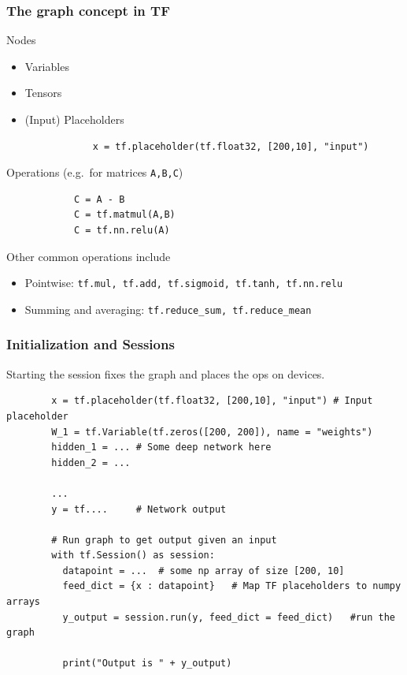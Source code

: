 \documentclass[mathserif]{beamer}
\begin{document}
\begin{frame}[fragile]
	\frametitle{The graph concept in TF}
		
	
	\begin{block}{Nodes}
	\begin{itemize}		
		\item Variables
		\item Tensors
		\item (Input) Placeholders
		\begin{verbatim}
			x = tf.placeholder(tf.float32, [200,10], "input")
		\end{verbatim}
	\end{itemize}
	\end{block}
	\begin{block}{Operations (e.g.\ for matrices \texttt{A,B,C})}
		\begin{verbatim}
			C = A - B
			C = tf.matmul(A,B)
			C = tf.nn.relu(A)
		\end{verbatim}
		Other common operations include
		
		\begin{itemize}
			\item\footnotesize Pointwise: \texttt{tf.mul, tf.add, tf.sigmoid, tf.tanh, tf.nn.relu}
			\item\footnotesize Summing and averaging: \texttt{tf.reduce\_sum, tf.reduce\_mean}		
		\end{itemize}		
	\end{block}
\end{frame}


\begin{frame}[fragile]
	\frametitle{Initialization and Sessions}
	  Starting the session fixes the graph and places the ops on devices.
	
	\begin{verbatim}
		x = tf.placeholder(tf.float32, [200,10], "input") # Input placeholder
		W_1 = tf.Variable(tf.zeros([200, 200]), name = "weights")
		hidden_1 = ... # Some deep network here
		hidden_2 = ...
		
		...
		y = tf....     # Network output
		
		# Run graph to get output given an input
		with tf.Session() as session:
		  datapoint = ...  # some np array of size [200, 10]
		  feed_dict = {x : datapoint}	# Map TF placeholders to numpy arrays
		  y_output = session.run(y, feed_dict = feed_dict)   #run the graph
		  
		  print("Output is " + y_output)
	\end{verbatim}
\end{frame}
\end{document}
